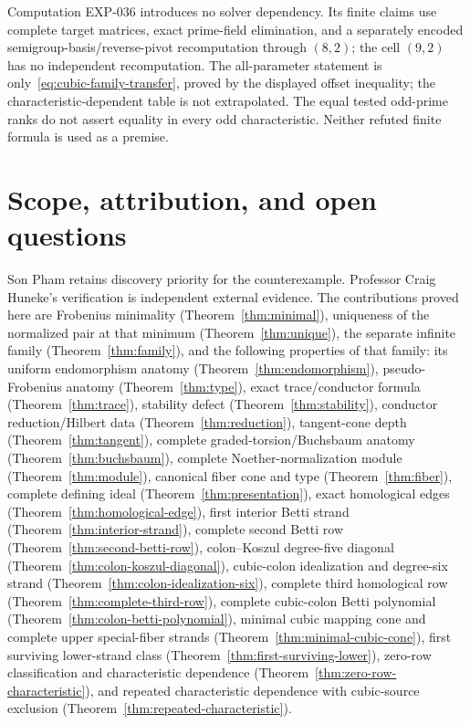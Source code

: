 \documentclass[11pt]{article}
\theoremstyle{definition}
\theoremstyle{remark}
\begin{document}
Computation EXP-036 introduces no solver dependency. Its finite claims use complete target
matrices, exact prime-field elimination, and a separately encoded semigroup-basis/reverse-pivot
recomputation through $(8,2)$; the cell $(9,2)$ has no independent recomputation. The
all-parameter statement is only~\eqref{eq:cubic-family-transfer}, proved by the displayed offset
inequality; the characteristic-dependent table is not extrapolated. The equal tested odd-prime
ranks do not assert equality in every odd characteristic. Neither refuted finite formula is used
as a premise.

\section{\texorpdfstring{\enspace}{}Scope, attribution, and open questions}

Son Pham retains discovery priority for the counterexample. Professor Craig Huneke's verification
is independent external evidence. The contributions proved here are Frobenius minimality
(Theorem~\ref{thm:minimal}), uniqueness of the normalized pair at that minimum
(Theorem~\ref{thm:unique}), the separate infinite family (Theorem~\ref{thm:family}), and the
following properties of that family: its uniform endomorphism anatomy
(Theorem~\ref{thm:endomorphism}), pseudo-Frobenius anatomy (Theorem~\ref{thm:type}), exact
trace/conductor formula (Theorem~\ref{thm:trace}), stability defect
(Theorem~\ref{thm:stability}), conductor reduction/Hilbert data (Theorem~\ref{thm:reduction}),
tangent-cone depth (Theorem~\ref{thm:tangent}), complete graded-torsion/Buchsbaum anatomy
(Theorem~\ref{thm:buchsbaum}), complete Noether-normalization module (Theorem~\ref{thm:module}),
canonical fiber cone and type (Theorem~\ref{thm:fiber}), complete defining ideal
(Theorem~\ref{thm:presentation}), exact homological edges (Theorem~\ref{thm:homological-edge}),
first interior Betti strand (Theorem~\ref{thm:interior-strand}), complete second Betti row
(Theorem~\ref{thm:second-betti-row}), colon--Koszul degree-five diagonal
(Theorem~\ref{thm:colon-koszul-diagonal}), cubic-colon idealization and degree-six strand
(Theorem~\ref{thm:colon-idealization-six}), complete third homological row
(Theorem~\ref{thm:complete-third-row}), complete cubic-colon Betti polynomial
(Theorem~\ref{thm:colon-betti-polynomial}), minimal cubic mapping cone and complete upper
special-fiber strands (Theorem~\ref{thm:minimal-cubic-cone}), first surviving lower-strand class
(Theorem~\ref{thm:first-surviving-lower}), zero-row classification and characteristic dependence
(Theorem~\ref{thm:zero-row-characteristic}), and repeated characteristic dependence with
cubic-source exclusion (Theorem~\ref{thm:repeated-characteristic}).
\end{document}
